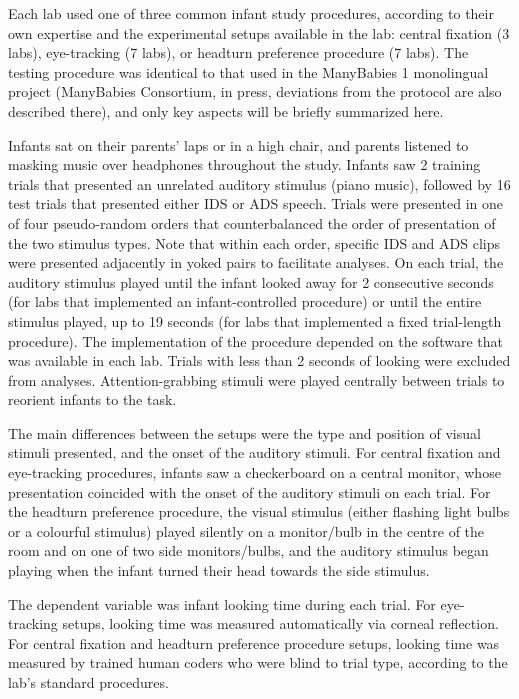 \documentclass[english,,man,floatsintext]{apa6}
\begin{document}
Each lab used one of three common infant study procedures, according to their own expertise and the experimental setups available in the lab: central fixation (3 labs), eye-tracking (7 labs), or headturn preference procedure (7 labs). The testing procedure was identical to that used in the ManyBabies 1 monolingual project (ManyBabies Consortium, in press, deviations from the protocol are also described there), and only key aspects will be briefly summarized here.

Infants sat on their parents' laps or in a high chair, and parents listened to masking music over headphones throughout the study. Infants saw 2 training trials that presented an unrelated auditory stimulus (piano music), followed by 16 test trials that presented either IDS or ADS speech. Trials were presented in one of four pseudo-random orders that counterbalanced the order of presentation of the two stimulus types. Note that within each order, specific IDS and ADS clips were presented adjacently in yoked pairs to facilitate analyses. On each trial, the auditory stimulus played until the infant looked away for 2 consecutive seconds (for labs that implemented an infant-controlled procedure) or until the entire stimulus played, up to 19 seconds (for labs that implemented a fixed trial-length procedure). The implementation of the procedure depended on the software that was available in each lab. Trials with less than 2 seconds of looking were excluded from analyses. Attention-grabbing stimuli were played centrally between trials to reorient infants to the task.

The main differences between the setups were the type and position of visual stimuli presented, and the onset of the auditory stimuli. For central fixation and eye-tracking procedures, infants saw a checkerboard on a central monitor, whose presentation coincided with the onset of the auditory stimuli on each trial. For the headturn preference procedure, the visual stimulus (either flashing light bulbs or a colourful stimulus) played silently on a monitor/bulb in the centre of the room and on one of two side monitors/bulbs, and the auditory stimulus began playing when the infant turned their head towards the side stimulus.

The dependent variable was infant looking time during each trial. For eye-tracking setups, looking time was measured automatically via corneal reflection. For central fixation and headturn preference procedure setups, looking time was measured by trained human coders who were blind to trial type, according to the lab's standard procedures.
\end{document}
